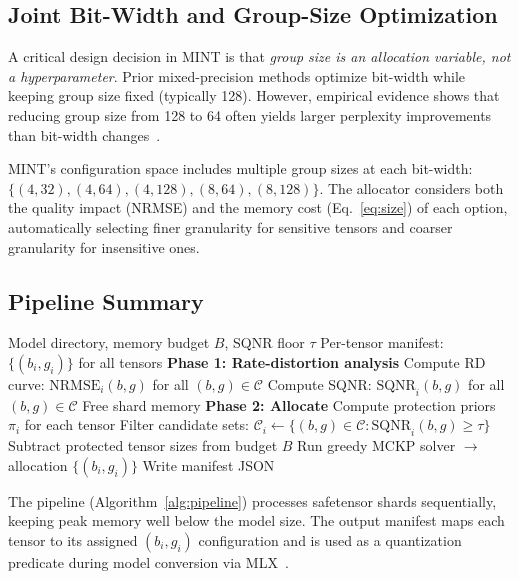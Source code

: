 \documentclass{article}
\begin{document}
\subsection{Joint Bit-Width and Group-Size Optimization}

A critical design decision in MINT is that \emph{group size is an allocation variable, not a hyperparameter}. Prior mixed-precision methods optimize bit-width while keeping group size fixed (typically 128). However, empirical evidence shows that reducing group size from 128 to 64 often yields larger perplexity improvements than bit-width changes~\cite{li2025mixllm}.

MINT's configuration space includes multiple group sizes at each bit-width: $\{(4,32), (4,64), (4,128), (8,64), (8,128)\}$. The allocator considers both the quality impact (NRMSE) and the memory cost (Eq.~\ref{eq:size}) of each option, automatically selecting finer granularity for sensitive tensors and coarser granularity for insensitive ones.

\subsection{Pipeline Summary}

\begin{algorithm}[t]
\caption{MINT Analysis and Allocation Pipeline}
\label{alg:pipeline}
\begin{algorithmic}[1]
\REQUIRE Model directory, memory budget $B$, SQNR floor $\tau$
\ENSURE Per-tensor manifest: $\{(b_i, g_i)\}$ for all tensors
\STATE \textbf{Phase 1: Rate-distortion analysis}
        \STATE Compute RD curve: $\text{NRMSE}_i(b,g)$ for all $(b,g) \in \mathcal{C}$
        \STATE Compute SQNR: $\text{SQNR}_i(b,g)$ for all $(b,g) \in \mathcal{C}$
    \ENDFOR
    \STATE Free shard memory
\ENDFOR
\STATE \textbf{Phase 2: Allocate}
\STATE Compute protection priors $\pi_i$ for each tensor
\STATE Filter candidate sets: $\mathcal{C}_i \leftarrow \{(b,g) \in \mathcal{C} : \text{SQNR}_i(b,g) \geq \tau\}$
\STATE Subtract protected tensor sizes from budget $B$
\STATE Run greedy MCKP solver $\rightarrow$ allocation $\{(b_i, g_i)\}$
\STATE Write manifest JSON
\end{algorithmic}
\end{algorithm}

The pipeline (Algorithm~\ref{alg:pipeline}) processes safetensor shards sequentially, keeping peak memory well below the model size. The output manifest maps each tensor to its assigned $(b_i, g_i)$ configuration and is used as a quantization predicate during model conversion via MLX~\cite{mlx2023}.
\end{document}
